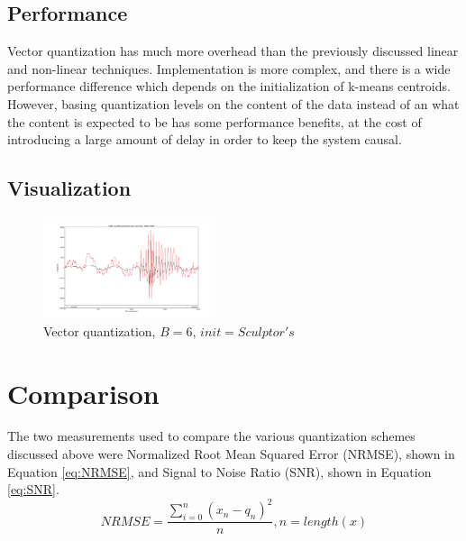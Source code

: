\documentclass[journal]{IEEEtran}
\begin{document}
\subsection{Performance}
Vector quantization has much more overhead than the previously discussed linear and non-linear techniques. Implementation is more complex, and 
there is a wide performance difference which depends on the initialization of k-means centroids. However, basing quantization levels on the content
of the data instead of an what the content is expected to be has some performance benefits, at the cost of introducing a large amount of delay in order
to keep the system causal.

\subsection{Visualization}
\begin{figure}[h!]
\centering
  \includegraphics[width=0.45\textwidth]{vector_6bit.png}
\caption{Vector quantization, $B = 6$, $init = Sculptor's$}
\label{fig:linear}
\end{figure}

\section{Comparison}
The two measurements used to compare the various quantization schemes discussed above were Normalized Root Mean Squared Error (NRMSE), shown in Equation
\ref{eq:NRMSE}, and Signal to Noise Ratio (SNR), shown in Equation \ref{eq:SNR}. \cite{DSPBook}
\begin{equation}
    NRMSE = \frac{\sum_{i=0}^n (x_n - q_n)^2}{n}, n = length(x)
    \label{eq:NRMSE}
\end{equation}
\end{document}
